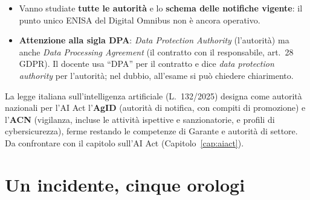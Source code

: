 \begin{esame}
\begin{itemize}
  \item Vanno studiate \textbf{tutte le autorità} e lo \textbf{schema delle notifiche vigente}: il
    punto unico ENISA del Digital Omnibus non è ancora operativo.
  \item \textbf{Attenzione alla sigla DPA}: \emph{Data Protection Authority} (l'autorità) ma anche
    \emph{Data Processing Agreement} (il contratto con il responsabile, art.~28 GDPR). Il docente usa
    ``DPA'' per il contratto e dice \emph{data protection authority} per l'autorità; nel dubbio, all'esame
    si può chiedere chiarimento.
\end{itemize}
\end{esame}

\begin{integrazione}
La legge italiana sull'intelligenza artificiale (L.~132/2025) designa come autorità nazionali per l'AI
Act l'\textbf{AgID} (autorità di notifica, con compiti di promozione) e l'\textbf{ACN} (vigilanza,
incluse le attività ispettive e sanzionatorie, e profili di cybersicurezza), ferme restando le
competenze di Garante e autorità di settore. Da confrontare con il capitolo sull'AI Act
(Capitolo~\ref{cap:aiact}).
\end{integrazione}

\section{Un incidente, cinque orologi}
\label{sec:intro-orologi}

